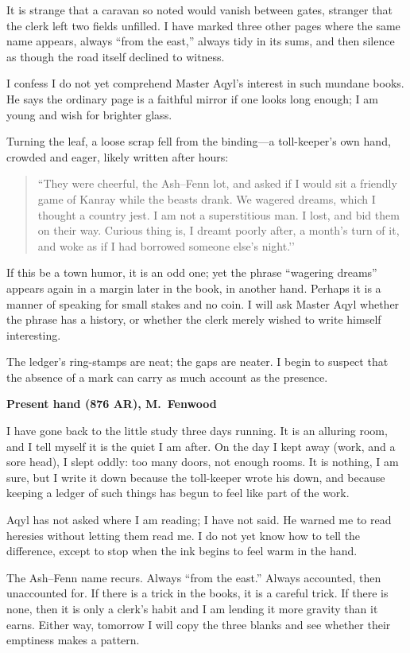 \documentclass[11pt]{article}
\begin{document}
It is strange that a caravan so noted would vanish between gates, stranger that the clerk left two fields unfilled. I have marked three other pages where the same name appears, always ``from the east,'' always tidy in its sums, and then silence as though the road itself declined to witness.

I confess I do not yet comprehend Master Aqyl’s interest in such mundane books. He says the ordinary page is a faithful mirror if one looks long enough; I am young and wish for brighter glass.

Turning the leaf, a loose scrap fell from the binding---a toll-keeper’s own hand, crowded and eager, likely written after hours:

\begin{quote}
\small
``They were cheerful, the Ash--Fenn lot, and asked if I would sit a friendly game of Kanray while the beasts drank. We wagered dreams, which I thought a country jest. I am not a superstitious man. I lost, and bid them on their way. Curious thing is, I dreamt poorly after, a month’s turn of it, and woke as if I had borrowed someone else’s night.’’
\end{quote}

If this be a town humor, it is an odd one; yet the phrase ``wagering dreams'' appears again in a margin later in the book, in another hand. Perhaps it is a manner of speaking for small stakes and no coin. I will ask Master Aqyl whether the phrase has a history, or whether the clerk merely wished to write himself interesting.

The ledger’s ring-stamps are neat; the gaps are neater. I begin to suspect that the absence of a mark can carry as much account as the presence.

\medskip
\noindent\textbf{Present hand (876 AR), M.\ Fenwood}

I have gone back to the little study three days running. It is an alluring room, and I tell myself it is the quiet I am after. On the day I kept away (work, and a sore head), I slept oddly: too many doors, not enough rooms. It is nothing, I am sure, but I write it down because the toll-keeper wrote his down, and because keeping a ledger of such things has begun to feel like part of the work.

Aqyl has not asked where I am reading; I have not said. He warned me to read heresies without letting them read me. I do not yet know how to tell the difference, except to stop when the ink begins to feel warm in the hand.

The Ash--Fenn name recurs. Always ``from the east.'' Always accounted, then unaccounted for. If there is a trick in the books, it is a careful trick. If there is none, then it is only a clerk’s habit and I am lending it more gravity than it earns. Either way, tomorrow I will copy the three blanks and see whether their emptiness makes a pattern.
\end{document}
